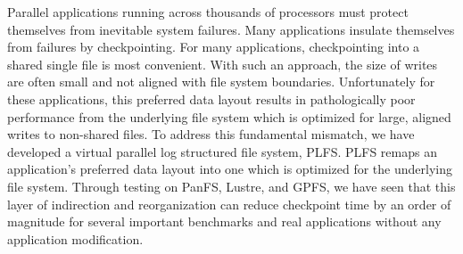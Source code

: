 {{%
Parallel applications running across thousands of processors must protect
themselves from inevitable system failures. Many applications insulate
themselves from failures by checkpointing. For many applications, checkpointing
into a shared single file is most convenient. With such an approach, the size
of writes are often small and not aligned with file system boundaries.
Unfortunately for these applications, this preferred data layout results in
pathologically poor performance from the underlying file system which is
optimized for large, aligned writes to non-shared files. To address this
fundamental mismatch, we have developed a virtual parallel log structured file
system, PLFS. PLFS remaps an application's preferred data layout into one which
is optimized for the underlying file system. Through testing on PanFS, Lustre,
and GPFS, we have seen that this layer of indirection and reorganization can
reduce checkpoint time by an order of magnitude for several important
benchmarks and real applications without any application modification.  
} 
}

